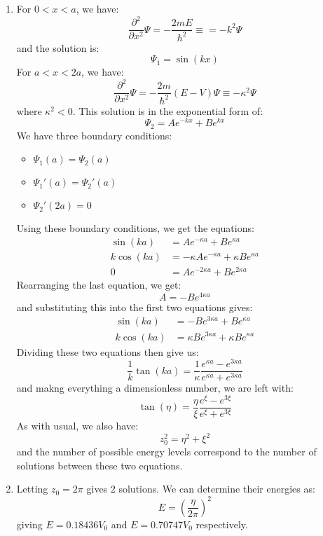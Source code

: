 \begin{sol}
\begin{enumerate}[label=\textbf{(\alph*)}]
\item For $0<x<a$, we have:
$$\frac{\partial^2}{\partial x^2}\Psi = -\frac{2mE}{\hbar^2} \equiv = -k^2\Psi$$
and the solution is:
$$\Psi_1=\sin(kx)$$
For $a<x<2a$, we have:
$$\frac{\partial^2}{\partial x^2}\Psi=-\frac{2m}{\hbar^2}(E-V)\Psi \equiv -\kappa^2\Psi$$
where $\kappa^2 < 0$. This solution is in the exponential form of:
$$\Psi_2=Ae^{-kx}+Be^{kx}$$
We have three boundary conditions:
\begin{itemize}
    \item $\Psi_1(a)=\Psi_2(a)$
    \item $\Psi_1'(a)=\Psi_2'(a)$
    \item $\Psi_2'(2a)=0$
\end{itemize}
Using these boundary conditions, we get the equations:
\begin{align*}
    \sin(ka)&=Ae^{-\kappa a}+Be^{\kappa a} \\
    k\cos(ka) &= -\kappa A e^{-\kappa a}+\kappa Be^{\kappa a} \\
    0 &= Ae^{-2\kappa a} + Be^{2\kappa a}
\end{align*}
Rearranging the last equation, we get:
$$A=-Be^{4\kappa a}$$
and substituting this into the first two equations gives:
\begin{align*}
    \sin(ka)&=-Be^{3\kappa a}+Be^{\kappa a} \\
    k\cos(ka) &= \kappa Be^{3\kappa a}+\kappa Be^{\kappa a}
\end{align*}
Dividing these two equations then give us:
$$\frac{1}{k}\tan(ka)=\frac{1}{\kappa}\frac{e^{\kappa a}-e^{3\kappa a}}{e^{\kappa a}+e^{3\kappa a}}$$
and makng everything a dimensionless number, we are left with:
$$\tan(\eta)=\frac{\eta}{\xi}\frac{e^\xi-e^{3\xi}}{e^\xi+e^{3\xi}}$$
As with usual, we also have:
$$z_0^2=\eta^2+\xi^2$$
and the number of possible energy levels correspond to the number of solutions between these two equations.
\item Letting $z_0=2\pi$ gives $2$ solutions. We can determine their energies as:
$$E=\left(\frac{\eta}{2\pi}\right)^2$$
giving $E=0.18436V_0$ and $E=0.70747V_0$ respectively.

\end{enumerate}
\end{sol}